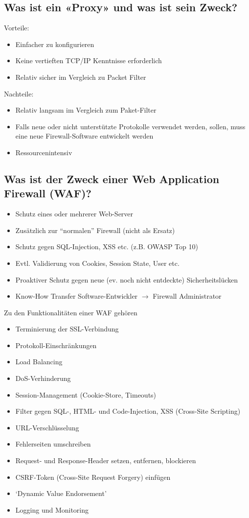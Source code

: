 \subsection*{Was ist ein «Proxy» und was ist sein Zweck?}
Vorteile:
\begin{itemize}
    \item Einfacher zu konfigurieren
    \item Keine vertieften TCP/IP Kenntnisse erforderlich
    \item Relativ sicher im Vergleich zu Packet Filter
\end{itemize}
Nachteile:
\begin{itemize}
    \item Relativ langsam im Vergleich zum Paket-Filter
    \item Falls neue oder nicht unterstützte Protokolle verwendet werden, sollen, muss eine neue Firewall-Software entwickelt werden
    \item Ressourcenintensiv
\end{itemize}

\subsection*{Was ist der Zweck einer Web Application Firewall (WAF)?}
\begin{itemize}
    \item Schutz eines oder mehrerer Web-Server
    \item Zusätzlich zur "`normalen"' Firewall (nicht als Ersatz)
    \item Schutz gegen SQL-Injection, XSS etc. (z.B. OWASP Top 10)
    \item Evtl. Validierung von Cookies, Session State, User etc.
    \item Proaktiver Schutz gegen neue (ev. noch nicht entdeckte) Sicherheitslücken
    \item Know-How Transfer Software-Entwickler $\rightarrow$ Firewall Administrator
\end{itemize}

Zu den Funktionalitäten einer WAF gehören
\begin{itemize}
    \item Terminierung der SSL-Verbindung
    \item Protokoll-Einschränkungen
    \item Load Balancing
    \item DoS-Verhinderung
    \item Session-Management (Cookie-Store, Timeouts)
    \item Filter gegen SQL-, HTML- und Code-Injection, XSS (Cross-Site Scripting)
    \item URL-Verschlüsselung
    \item Fehlerseiten umschreiben
    \item Request- und Response-Header setzen, entfernen, blockieren
    \item CSRF-Token (Cross-Site Request Forgery) einfügen
    \item `Dynamic Value Endorsement'
    \item Logging und Monitoring
\end{itemize}
